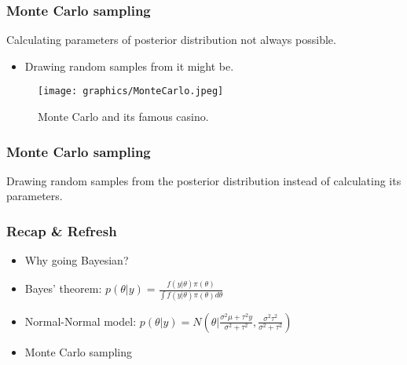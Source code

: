\documentclass{beamer}
\newcommand{\1}{\ensuremath{\mathbf{1}}}
\begin{document}
%
%
%
\begin{frame}\frametitle{Monte Carlo sampling}
	Calculating parameters of posterior distribution not always possible.
	\begin{itemize}
		\item Drawing random samples from it might be.
	\end{itemize}
	\begin{figure}
	\begin{center}
		\texttt{[image: graphics/MonteCarlo.jpeg]}
	\end{center}
	\caption{Monte Carlo and its famous casino.}
	\end{figure}
\end{frame}
%
%
%
\begin{frame}\frametitle{Monte Carlo sampling}
	Drawing random samples from the posterior distribution instead of calculating its parameters.
	\begin{center}
	\end{center}
\end{frame}
%
%
%
\begin{frame}\frametitle{Recap \& Refresh}
	\begin{itemize}
		\item Why going Bayesian? %
		\item Bayes' theorem: $p(\theta|y) = \frac{f(y|\theta)\pi(\theta)}{\int f(y|\theta)\pi(\theta)d\theta}$
		\item Normal-Normal model: $p(\theta|y) = N( \theta | \frac{\sigma^2\mu + \tau^2 y}{\sigma^2 + \tau^2}, \frac{\sigma^2\tau^2}{\sigma^2 + \tau^2})$
		\item Monte Carlo sampling
	\end{itemize}
\end{frame}
\end{document}

